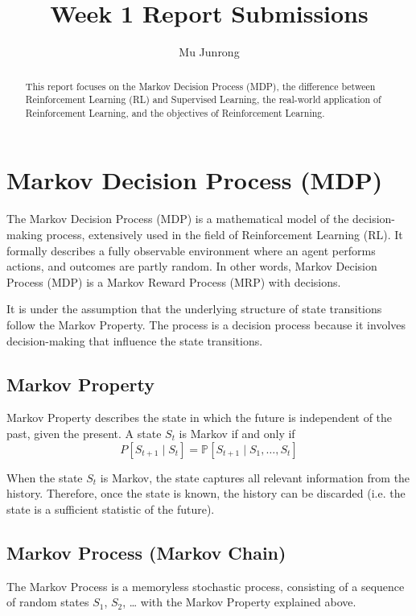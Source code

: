 \documentclass{article} %
\title{Week 1 Report Submissions}
\author{Mu Junrong}
\begin{document}
\ifcolmsubmission
\linenumbers
\fi

\maketitle

\begin{abstract}
This report focuses on the Markov Decision Process (MDP), the difference between Reinforcement Learning (RL) and Supervised Learning, the real-world application of Reinforcement Learning, and the objectives of Reinforcement Learning.
\end{abstract}

\section{Markov Decision Process (MDP)}

The Markov Decision Process (MDP) is a mathematical model of the decision-making process, extensively used in the field of Reinforcement Learning (RL)\cite{wiki_mdp}. It formally describes a fully observable environment where an agent performs actions, and outcomes are partly random. In other words, Markov Decision Process (MDP) is a Markov Reward Process (MRP) with decisions. 

It is under the assumption that the underlying structure of state transitions follow the Markov Property. The process is a decision process because it involves decision-making that influence the state transitions.


\subsection{Markov Property}

Markov Property describes the state in which the future is independent of the past, given the present. A state $S_t$ is Markov if and only if
\[{P}[S_{t+1} \mid S_t] = \mathbb{P}[S_{t+1} \mid S_1, \ldots, S_t]\]

When the state $S_t$ is Markov, the state captures all relevant information from the history. Therefore, once the state is known, the history can be discarded (i.e. the state is a sufficient statistic of the future).


\subsection{Markov Process (Markov Chain)}

The Markov Process is a memoryless stochastic process, consisting of a sequence of random states $S_1$, $S_2$, … with the Markov Property explained above. 
\end{document}
